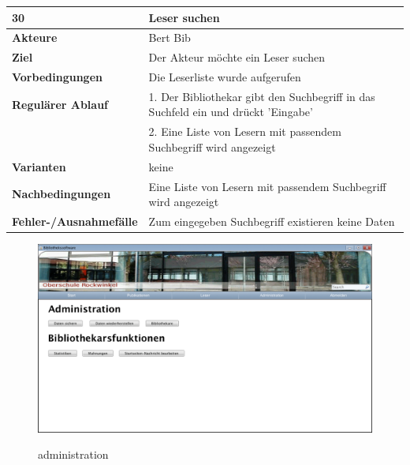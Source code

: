 \documentclass[fontsize=12pt,paper=a4,twoside]{scrartcl}
\begin{document}
\newpage
\begin{table}[htbp]
\label{30}
\begin{tabular}{|l|p{10cm}|}
\hline 
\textbf{30} & \textbf{Leser suchen} \\ \hline
\textbf{Akteure} & Bert Bib\\ \hline
\textbf{Ziel} & Der Akteur möchte ein Leser suchen \\ \hline
\textbf{Vorbedingungen} & Die Leserliste wurde aufgerufen \\ \hline
\textbf{Regulärer Ablauf} & 
1. Der Bibliothekar gibt den Suchbegriff in das Suchfeld ein und drückt 'Eingabe' \\
&2. Eine Liste von Lesern mit passendem Suchbegriff wird angezeigt\\
\hline
\textbf{Varianten} & 
keine \\ \hline
\textbf{Nachbedingungen} & Eine Liste von Lesern mit passendem Suchbegriff wird angezeigt\\ \hline
\textbf{Fehler-/Ausnahmefälle} & Zum eingegeben Suchbegriff existieren keine Daten\\
\hline
\end{tabular}
\end{table}

\begin{figure}[htbp]
\caption{administration}
\includegraphics[width=1\textwidth]{ScreensWebsite/Administration.png}
  \label{Leser administration}
\end{figure}
\end{document}
